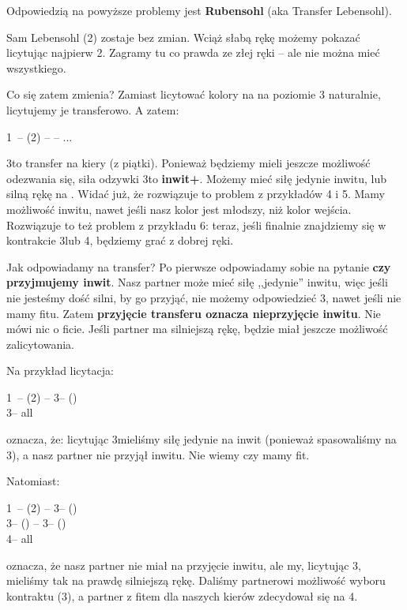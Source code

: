 \documentclass[12pt, a4paper]{article}
\begin{document}
Odpowiedzią na powyższe problemy jest 
\textbf{{\color{red}R}{\color{orange}u}{\color{LimeGreen}b}{\color{cyan}e}{\color{blue}n}{\color{purple}s}{\color{red}o}{\color{orange}h}{\color{LimeGreen}l}} (aka Transfer Lebensohl).

Sam Lebensohl (2\nt) zostaje bez zmian. Wciąż słabą rękę możemy pokazać licytując najpierw 2\nt.
Zagramy tu co prawda ze złej ręki -- ale nie można mieć wszystkiego.

Co się zatem zmienia? Zamiast licytować kolory na na poziomie 3 naturalnie, licytujemy je transferowo.
A zatem:

1\nt\ -- (2\spades) -- \alrts{3\diams} -- ...

3\diams to transfer na kiery (z piątki). Ponieważ będziemy mieli jeszcze możliwość odezwania się,
siła odzywki 3\diams to \textbf{inwit+}. Możemy mieć siłę jedynie inwitu, lub silną rękę na \gf.
Widać już, że rozwiązuje to problem  z przykładów 4 i 5. Mamy możliwość inwitu, nawet jeśli nasz kolor jest
młodszy, niż kolor wejścia. Rozwiązuje to też problem  z przykładu 6: teraz, jeśli finalnie
znajdziemy się w kontrakcie 3\hearts lub 4\hearts, będziemy grać z dobrej ręki.

Jak odpowiadamy na transfer? Po pierwsze odpowiadamy sobie na pytanie \textbf{czy przyjmujemy inwit}.
Nasz partner może mieć siłę ,,jedynie'' inwitu, więc jeśli nie jesteśmy dość silni, by go przyjąć,
nie możemy odpowiedzieć 3\nt, nawet jeśli nie mamy fitu. Zatem \textbf{przyjęcie transferu oznacza
nieprzyjęcie inwitu}. Nie mówi nic o ficie. Jeśli partner ma silniejszą rękę, będzie miał jeszcze
możliwość zalicytowania.

Na przykład licytacja:

1\nt\ -- (2\spades) -- 3\diams -- (\pass)\\
3\hearts -- all \pass

oznacza, że: licytując 3\diams mieliśmy siłę jedynie na inwit (ponieważ spasowaliśmy na 3\hearts),
a nasz partner nie przyjął inwitu. Nie wiemy czy mamy fit.

Natomiast:

1\nt\ -- (2\spades) -- 3\diams -- (\pass)\\
3\hearts -- (\pass) -- 3\nt -- (\pass)\\
4\hearts -- all \pass

oznacza, że nasz partner nie miał na przyjęcie inwitu, ale my, licytując 3\diams, mieliśmy tak na prawdę
silniejszą rękę. Daliśmy partnerowi możliwość wyboru kontraktu (3\nt), a partner z fitem dla naszych
kierów zdecydował się na 4\hearts.
\end{document}
